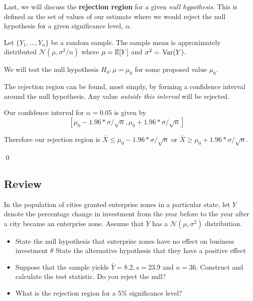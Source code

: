 \documentclass[12pt]{article}
\begin{document}
Last, we will discuss the \textbf{rejection region} for a given \emph{null hypothesis}. This is defined as the set of values of our estimate where we would reject the null hypothesis for a given significance level, $\alpha$.

\begin{example}
  Let $\{ Y_1, \dots, Y_n \}$ be a random sample. The sample mean is approximately distributed $\mathcal{N}(\mu, \sigma^2 / n)$ where $\mu = \expec{Y}$ and $\sigma^2 = \var{Y}$.

  We will test the null hypothesis $H_0: \mu = \mu_0$ for some proposed value $\mu_0$.

  The rejection region can be found, most simply, by forming a confidence interval around the null hypothesis. Any value \emph{outside this interval} will be rejected.

  Our confidence interval for $\alpha = 0.05$ is given by
  $$
    \left[ \mu_0 - 1.96 * \sigma/\sqrt{n},  \mu_0 + 1.96 * \sigma/\sqrt{n} \right]
  $$

  Therefore our rejection region is $\bar{X} \leq \mu_0 - 1.96 * \sigma/\sqrt{n}$ or $\bar{X} \geq \mu_0 + 1.96 * \sigma/\sqrt{n}$.

  \qed
\end{example}



\subsection*{Review}

In the population of cities granted enterprise zones in a particular state, let $Y$ denote the percentage change in investment from the year before to the year after a city became an enterprise zone. Assume that $Y$ has a $\mathcal{N}(\mu, \sigma^2)$ distribution.
\begin{itemize}
  \item State the null hypothesis that enterprise zones have no effect on business investment $\theta$ State the alternative hypothesis that they have a positive effect

  \item Suppose that the sample yields $\bar{Y} = 8.2, s = 23.9$ and $n = 36$. Construct and calculate the test statistic. Do you reject the null?

  \item What is the rejection region for a 5\% significance level?
\end{itemize}


\end{document}
